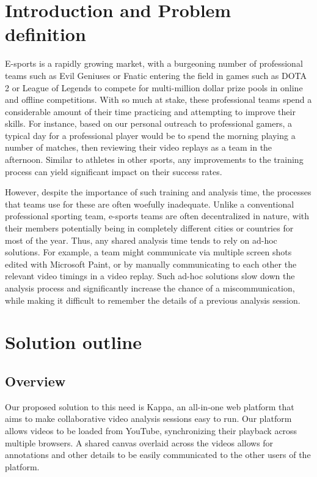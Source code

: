 \documentclass[conference]{IEEEtran}
\begin{document}
\section{Introduction and Problem definition}

  E-sports is a rapidly growing market, with a burgeoning number of professional teams such as Evil Geniuses \cite{EGwebsite} or Fnatic \cite{fnaticwebsite} entering the field in games such as DOTA 2 \cite{dotawebsite} or League of Legends \cite{lolwebsite} to compete for multi-million dollar prize pools in online and offline competitions. With so much at stake, these professional teams spend a considerable amount of their time practicing and attempting to improve their skills. For instance, based on our personal outreach to professional gamers, a typical day for a professional player would be to spend the morning playing a number of matches, then reviewing their video replays as a team in the afternoon. Similar to athletes in other sports, any improvements to the training process can yield significant impact on their success rates.

  However, despite the importance of such training and analysis time, the processes that teams use for these are often woefully inadequate. Unlike a conventional professional sporting team, e-sports teams are often decentralized in nature, with their members potentially being in completely different cities or countries for most of the year. Thus, any shared analysis time tends to rely on ad-hoc solutions. For example, a team might communicate via multiple screen shots edited with Microsoft Paint, or by manually communicating to each other the relevant video timings in a video replay. Such ad-hoc solutions slow down the analysis process and significantly increase the chance of a miscommunication, while making it difficult to remember the details of a previous analysis session.

\section{Solution outline}

\subsection{Overview}

  Our proposed solution to this need is Kappa, an all-in-one web platform that aims to make collaborative video analysis sessions easy to run. Our platform allows videos to be loaded from YouTube, synchronizing their playback across multiple browsers. A shared canvas overlaid across the videos allows for annotations and other details to be easily communicated to the other users of the platform.
\end{document}
